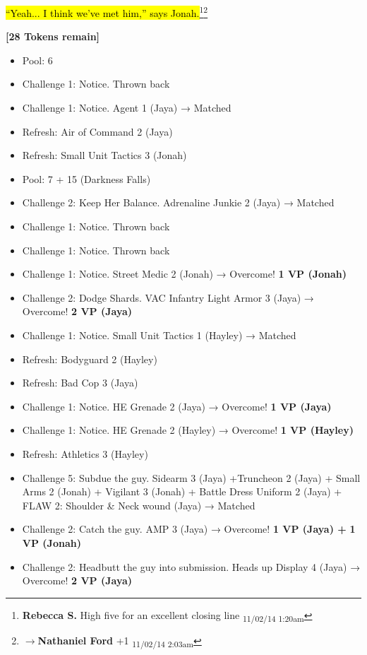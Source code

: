 \hl{``Yeah... I think we've met him,'' says Jonah.}\footnote{\textbf{Rebecca S. }High five for an excellent closing line \textsubscript{11/02/14 1:20am}}\footnote{$\rightarrow$\textbf{Nathaniel Ford }+1 \textsubscript{11/02/14 2:03am}}



\textbf{{[}28 Tokens remain{]}}





\begin{itemize}
\item Pool: 6
\item Challenge 1: Notice.  Thrown back
\item Challenge 1: Notice.  Agent 1 (Jaya) → Matched
\item Refresh: Air of Command 2 (Jaya)
\item Refresh: Small Unit Tactics 3 (Jonah)
\item Pool: 7 + 15 (Darkness Falls)
\item Challenge 2: Keep Her Balance.  Adrenaline Junkie 2 (Jaya) → Matched
\item Challenge 1: Notice.  Thrown back
\item Challenge 1: Notice.  Thrown back
\item Challenge 1: Notice.  Street Medic 2 (Jonah) → Overcome! \textbf{1 VP (Jonah)}
\item Challenge 2: Dodge Shards.  VAC Infantry Light Armor 3 (Jaya) → Overcome! \textbf{2 VP (Jaya)}
\item Challenge 1: Notice.  Small Unit Tactics 1 (Hayley) → Matched
\item Refresh: Bodyguard 2 (Hayley)
\item Refresh: Bad Cop 3 (Jaya)
\item Challenge 1: Notice.  HE Grenade 2 (Jaya) → Overcome! \textbf{1 VP (Jaya)}
\item Challenge 1: Notice.  HE Grenade 2 (Hayley) → Overcome! \textbf{1 VP (Hayley)}
\item Refresh: Athletics 3 (Hayley)
\item Challenge 5: Subdue the guy.  Sidearm 3 (Jaya) +Truncheon 2 (Jaya) + Small Arms 2 (Jonah) + Vigilant 3 (Jonah) + Battle Dress Uniform 2 (Jaya) + FLAW 2: Shoulder \& Neck wound (Jaya) → Matched
\item Challenge 2: Catch the guy.  AMP 3 (Jaya) → Overcome! \textbf{1 VP (Jaya) + } \textbf{1 VP (Jonah)}
\item Challenge 2: Headbutt the guy into submission.  Heads up Display 4 (Jaya) → Overcome! \textbf{2 VP (Jaya)}

\end{itemize}

